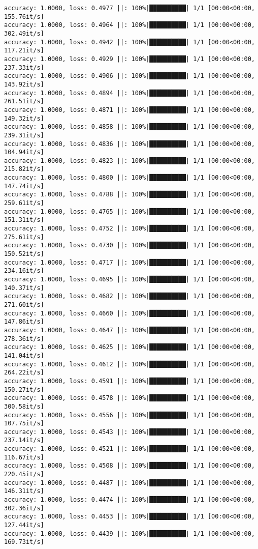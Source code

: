 \documentclass[
]{article}
\begin{document}
\begin{verbatim}
accuracy: 1.0000, loss: 0.4977 ||: 100%|██████████| 1/1 [00:00<00:00, 155.76it/s]
accuracy: 1.0000, loss: 0.4964 ||: 100%|██████████| 1/1 [00:00<00:00, 302.49it/s]
accuracy: 1.0000, loss: 0.4942 ||: 100%|██████████| 1/1 [00:00<00:00, 117.21it/s]
accuracy: 1.0000, loss: 0.4929 ||: 100%|██████████| 1/1 [00:00<00:00, 237.33it/s]
accuracy: 1.0000, loss: 0.4906 ||: 100%|██████████| 1/1 [00:00<00:00, 143.92it/s]
accuracy: 1.0000, loss: 0.4894 ||: 100%|██████████| 1/1 [00:00<00:00, 261.51it/s]
accuracy: 1.0000, loss: 0.4871 ||: 100%|██████████| 1/1 [00:00<00:00, 149.32it/s]
accuracy: 1.0000, loss: 0.4858 ||: 100%|██████████| 1/1 [00:00<00:00, 239.31it/s]
accuracy: 1.0000, loss: 0.4836 ||: 100%|██████████| 1/1 [00:00<00:00, 104.94it/s]
accuracy: 1.0000, loss: 0.4823 ||: 100%|██████████| 1/1 [00:00<00:00, 215.82it/s]
accuracy: 1.0000, loss: 0.4800 ||: 100%|██████████| 1/1 [00:00<00:00, 147.74it/s]
accuracy: 1.0000, loss: 0.4788 ||: 100%|██████████| 1/1 [00:00<00:00, 259.61it/s]
accuracy: 1.0000, loss: 0.4765 ||: 100%|██████████| 1/1 [00:00<00:00, 151.31it/s]
accuracy: 1.0000, loss: 0.4752 ||: 100%|██████████| 1/1 [00:00<00:00, 275.61it/s]
accuracy: 1.0000, loss: 0.4730 ||: 100%|██████████| 1/1 [00:00<00:00, 150.52it/s]
accuracy: 1.0000, loss: 0.4717 ||: 100%|██████████| 1/1 [00:00<00:00, 234.16it/s]
accuracy: 1.0000, loss: 0.4695 ||: 100%|██████████| 1/1 [00:00<00:00, 140.37it/s]
accuracy: 1.0000, loss: 0.4682 ||: 100%|██████████| 1/1 [00:00<00:00, 271.60it/s]
accuracy: 1.0000, loss: 0.4660 ||: 100%|██████████| 1/1 [00:00<00:00, 147.86it/s]
accuracy: 1.0000, loss: 0.4647 ||: 100%|██████████| 1/1 [00:00<00:00, 278.36it/s]
accuracy: 1.0000, loss: 0.4625 ||: 100%|██████████| 1/1 [00:00<00:00, 141.04it/s]
accuracy: 1.0000, loss: 0.4612 ||: 100%|██████████| 1/1 [00:00<00:00, 264.22it/s]
accuracy: 1.0000, loss: 0.4591 ||: 100%|██████████| 1/1 [00:00<00:00, 150.27it/s]
accuracy: 1.0000, loss: 0.4578 ||: 100%|██████████| 1/1 [00:00<00:00, 300.58it/s]
accuracy: 1.0000, loss: 0.4556 ||: 100%|██████████| 1/1 [00:00<00:00, 107.75it/s]
accuracy: 1.0000, loss: 0.4543 ||: 100%|██████████| 1/1 [00:00<00:00, 237.14it/s]
accuracy: 1.0000, loss: 0.4521 ||: 100%|██████████| 1/1 [00:00<00:00, 116.67it/s]
accuracy: 1.0000, loss: 0.4508 ||: 100%|██████████| 1/1 [00:00<00:00, 220.45it/s]
accuracy: 1.0000, loss: 0.4487 ||: 100%|██████████| 1/1 [00:00<00:00, 146.31it/s]
accuracy: 1.0000, loss: 0.4474 ||: 100%|██████████| 1/1 [00:00<00:00, 302.36it/s]
accuracy: 1.0000, loss: 0.4453 ||: 100%|██████████| 1/1 [00:00<00:00, 127.44it/s]
accuracy: 1.0000, loss: 0.4439 ||: 100%|██████████| 1/1 [00:00<00:00, 169.73it/s]

\end{verbatim}
\end{document}

